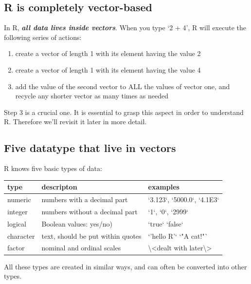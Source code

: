 \documentclass[]{book}
\providecommand{\tightlist}{%
  \setlength{\itemsep}{0pt}\setlength{\parskip}{0pt}}
\begin{document}
\hypertarget{r-is-completely-vector-based}{%
\subsection{R is completely vector-based}\label{r-is-completely-vector-based}}

In R, \emph{\textbf{all data lives inside vectors}}. When you type `2 + 4', R will execute the following series of actions:

\begin{enumerate}
\def\labelenumi{\arabic{enumi}.}
\tightlist
\item
  create a vector of length 1 with its element having the value 2
\item
  create a vector of length 1 with its element having the value 4
\item
  add the value of the second vector to ALL the values of vector one, and recycle any shorter vector as many times as needed
\end{enumerate}

Step 3 is a crucial one. It is essential to grasp this aspect in order to understand R. Therefore we'll revisit it later in more detail.

\hypertarget{five-datatype-that-live-in-vectors}{%
\subsection{Five datatype that live in vectors}\label{five-datatype-that-live-in-vectors}}

R knows five basic types of data:

\begin{tabular}{l|l|l}
\hline
type & descripton & examples\\
\hline
numeric & numbers with a decimal part & `3.123`, `5000.0`, `4.1E3`\\
\hline
integer & numbers without a decimal part & `1`, `0`, `2999`\\
\hline
logical & Boolean values: yes/no) & `true` `false`\\
\hline
character & text, should be put within quotes & `'hello R'` `"A cat!"`\\
\hline
factor & nominal and ordinal scales & \textbackslash{}<dealt with later\textbackslash{}>\\
\hline
\end{tabular}

All these types are created in similar ways, and can often be converted into other types.
\end{document}
